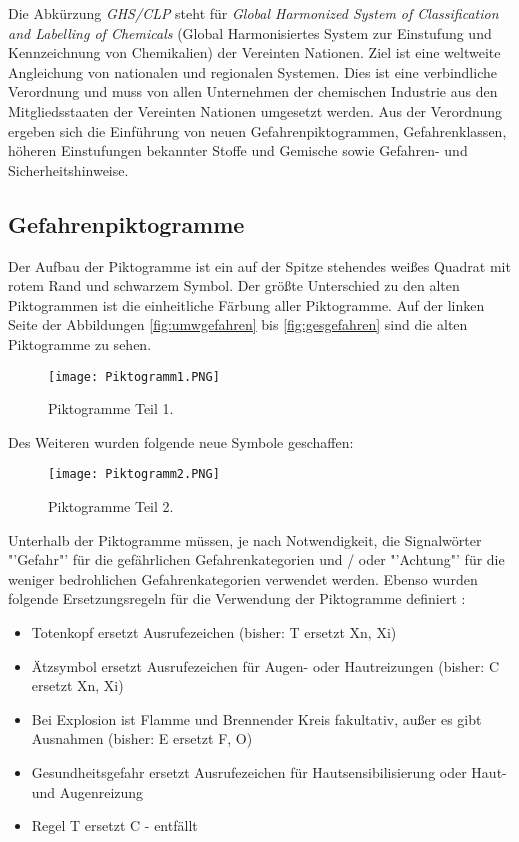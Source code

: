 Die Abkürzung \emph{GHS/CLP} steht für \emph{Global Harmonized System of 
Classification and Labelling of Chemicals} (Global Harmonisiertes System zur 
Einstufung und Kennzeichnung von Chemikalien) der Vereinten Nationen. Ziel ist 
eine weltweite Angleichung von nationalen und regionalen Systemen. Dies ist 
eine verbindliche Verordnung und muss von allen Unternehmen der chemischen 
Industrie aus den Mitgliedsstaaten der Vereinten Nationen umgesetzt werden. 
Aus der Verordnung ergeben sich die Einführung von neuen Gefahrenpiktogrammen, 
Gefahrenklassen, höheren Einstufungen bekannter Stoffe und Gemische sowie 
Gefahren- und Sicherheitshinweise. \cite{ifag}

\subsection{Gefahrenpiktogramme}

Der Aufbau der Piktogramme ist ein auf der Spitze stehendes weißes Quadrat mit 
rotem Rand und schwarzem Symbol. Der größte Unterschied zu den alten Piktogrammen
ist die einheitliche Färbung aller Piktogramme. Auf der linken Seite der Abbildungen 
\ref{fig:umwgefahren} bis \ref{fig:gesgefahren} sind die alten Piktogramme zu sehen.
\begin{figure}[!ht]
    \centering
    \texttt{[image: Piktogramm1.PNG]}
    \caption[Piktogramme Teil 1]{\small{Piktogramme Teil 1. \cite{ifaa}}}
    \label{fig:pikto1}
\end{figure}

\noindent
Des Weiteren wurden folgende neue Symbole geschaffen:
\begin{figure}[!ht]
    \centering
    \texttt{[image: Piktogramm2.PNG]}
    \caption[Piktogramme Teil 2]{\small{Piktogramme Teil 2. \cite{ifaa}}}
    \label{fig:pikto2}
\end{figure}

\noindent
Unterhalb der Piktogramme müssen, je nach Notwendigkeit, die Signalwörter "'Gefahr"' für 
die gefährlichen Gefahrenkategorien und / oder "'Achtung"' für die weniger 
bedrohlichen Gefahrenkategorien verwendet werden. Ebenso wurden folgende 
Ersetzungsregeln für die Verwendung der Piktogramme definiert \cite{ifaa}:
\begin{itemize}[itemsep=0pt]
    \item Totenkopf ersetzt Ausrufezeichen (bisher: T ersetzt Xn, Xi)
    \item Ätzsymbol ersetzt Ausrufezeichen für Augen- oder Hautreizungen 
    (bisher: C ersetzt Xn, Xi)
    \item Bei Explosion ist Flamme und Brennender Kreis fakultativ, außer es gibt 
    Ausnahmen (bisher: E ersetzt F, O)
    \item Gesundheitsgefahr ersetzt Ausrufezeichen für Hautsensibilisierung oder 
    Haut- und Augenreizung
    \item Regel T ersetzt C - entfällt
\end{itemize}

